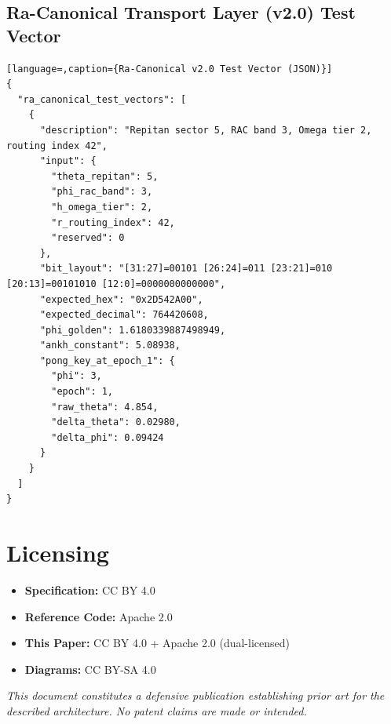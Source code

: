 \documentclass[11pt,a4paper]{article}
\begin{document}
\subsection{Ra-Canonical Transport Layer (v2.0) Test Vector}

\begin{lstlisting}[language=,caption={Ra-Canonical v2.0 Test Vector (JSON)}]
{
  "ra_canonical_test_vectors": [
    {
      "description": "Repitan sector 5, RAC band 3, Omega tier 2, routing index 42",
      "input": {
        "theta_repitan": 5,
        "phi_rac_band": 3,
        "h_omega_tier": 2,
        "r_routing_index": 42,
        "reserved": 0
      },
      "bit_layout": "[31:27]=00101 [26:24]=011 [23:21]=010 [20:13]=00101010 [12:0]=0000000000000",
      "expected_hex": "0x2D542A00",
      "expected_decimal": 764420608,
      "phi_golden": 1.6180339887498949,
      "ankh_constant": 5.08938,
      "pong_key_at_epoch_1": {
        "phi": 3,
        "epoch": 1,
        "raw_theta": 4.854,
        "delta_theta": 0.02980,
        "delta_phi": 0.09424
      }
    }
  ]
}
\end{lstlisting}

\section{Licensing}

\begin{itemize}
    \item \textbf{Specification:} CC BY 4.0
    \item \textbf{Reference Code:} Apache 2.0
    \item \textbf{This Paper:} CC BY 4.0 + Apache 2.0 (dual-licensed)
    \item \textbf{Diagrams:} CC BY-SA 4.0
\end{itemize}

\vspace{2em}
\noindent\textit{This document constitutes a defensive publication establishing prior art for the described architecture. No patent claims are made or intended.}
\end{document}
